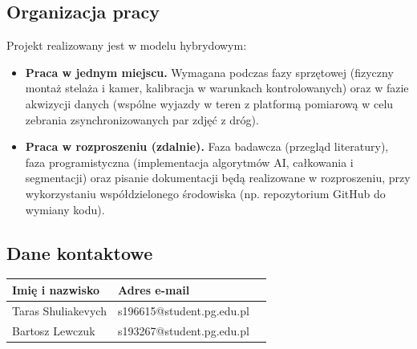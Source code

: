 \documentclass[11pt, a4paper]{article}
\begin{document}
\subsection{Organizacja pracy}
Projekt realizowany jest w modelu hybrydowym:
\begin{itemize}
    \item \textbf{Praca w jednym miejscu.} Wymagana podczas fazy sprzętowej (fizyczny montaż stelaża i kamer, kalibracja w warunkach kontrolowanych) oraz w fazie akwizycji danych (wspólne wyjazdy w teren z platformą pomiarową w celu zebrania zsynchronizowanych par zdjęć z dróg).
    \item \textbf{Praca w rozproszeniu (zdalnie).} Faza badawcza (przegląd literatury), faza programistyczna (implementacja algorytmów AI, całkowania i segmentacji) oraz pisanie dokumentacji będą realizowane w rozproszeniu, przy wykorzystaniu współdzielonego środowiska (np. repozytorium GitHub do wymiany kodu).
\end{itemize}

\subsection{Dane kontaktowe}
\begin{table}[h!]
\centering
\renewcommand{\arraystretch}{1.3}
\begin{tabular}{|l|l|l|}
\hline
\textbf{Imię i nazwisko} & \textbf{Adres e-mail} \\ \hline
Taras Shuliakevych & s196615@student.pg.edu.pl \\ \hline
Bartosz Lewczuk & s193267@student.pg.edu.pl \\ \hline
\end{tabular}
\label{tab:zespol_kontakt}
\end{table}
\end{document}
